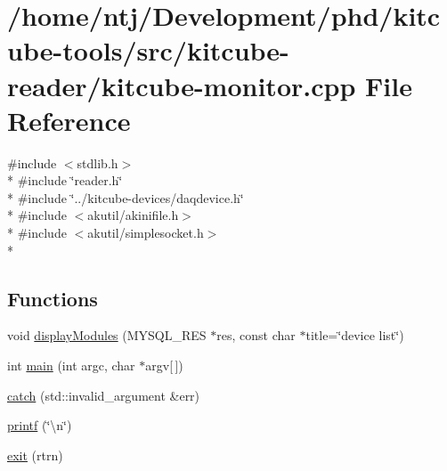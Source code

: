 \hypertarget{kitcube-monitor_8cpp}{\section{/home/ntj/\-Development/phd/kitcube-\/tools/src/kitcube-\/reader/kitcube-\/monitor.cpp File Reference}
\label{kitcube-monitor_8cpp}
}
{\ttfamily \#include $<$stdlib.\-h$>$}\\*
{\ttfamily \#include \char`\"{}reader.\-h\char`\"{}}\\*
{\ttfamily \#include \char`\"{}../kitcube-\/devices/daqdevice.\-h\char`\"{}}\\*
{\ttfamily \#include $<$akutil/akinifile.\-h$>$}\\*
{\ttfamily \#include $<$akutil/simplesocket.\-h$>$}\\*
\subsection*{Functions}
\begin{DoxyCompactItemize}
\item 
void \hyperlink{kitcube-monitor_8cpp_a669dec8b35dcb5667c14e87cac9d54e3}{display\-Modules} (M\-Y\-S\-Q\-L\-\_\-\-R\-E\-S $\ast$res, const char $\ast$title=\char`\"{}device list\char`\"{})
\item 
int \hyperlink{kitcube-monitor_8cpp_a0ddf1224851353fc92bfbff6f499fa97}{main} (int argc, char $\ast$argv\mbox{[}$\,$\mbox{]})
\item 
\hyperlink{kitcube-monitor_8cpp_a7dc1bc3cd78bc7cd7b19057e3d230ef1}{catch} (std\-::invalid\-\_\-argument \&err)
\item 
\hyperlink{kitcube-monitor_8cpp_a6ae2aa8511ac2b89b9f18965ab4a94ca}{printf} (\char`\"{}\textbackslash{}n\char`\"{})
\item 
\hyperlink{kitcube-monitor_8cpp_a2165891cc42ee4c285999210b23e0279}{exit} (rtrn)
\end{DoxyCompactItemize}


